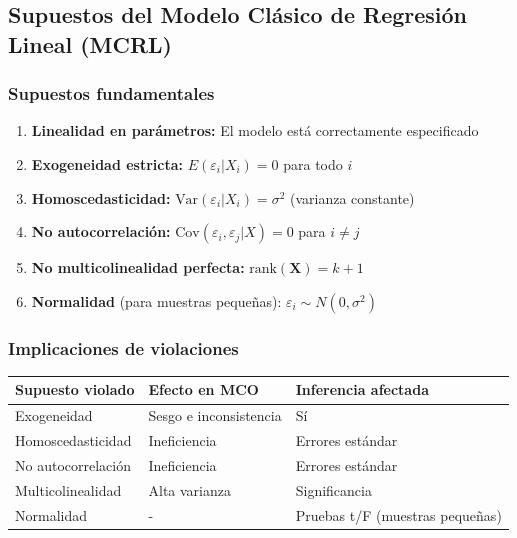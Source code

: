 \documentclass[
  oneside]{book}
\newcounter{none} %
\providecommand{\tightlist}{%
  \setlength{\itemsep}{0pt}\setlength{\parskip}{0pt}}
\begin{document}
\subsection{Supuestos del Modelo Clásico de Regresión Lineal (MCRL)}\label{supuestos-del-modelo-cluxe1sico-de-regresiuxf3n-lineal-mcrl}

\subsubsection{Supuestos fundamentales}\label{supuestos-fundamentales}

\begin{enumerate}
\def\labelenumi{\arabic{enumi}.}
\tightlist
\item
  \textbf{Linealidad en parámetros:} El modelo está correctamente especificado
\item
  \textbf{Exogeneidad estricta:} \(E(\varepsilon_i|X_i) = 0\) para todo \(i\)
\item
  \textbf{Homoscedasticidad:} \(\text{Var}(\varepsilon_i|X_i) = \sigma^2\) (varianza constante)
\item
  \textbf{No autocorrelación:} \(\text{Cov}(\varepsilon_i, \varepsilon_j|X) = 0\) para \(i \neq j\)
\item
  \textbf{No multicolinealidad perfecta:} \(\text{rank}(\mathbf{X}) = k+1\)
\item
  \textbf{Normalidad} (para muestras pequeñas): \(\varepsilon_i \sim N(0, \sigma^2)\)
\end{enumerate}

\subsubsection{Implicaciones de violaciones}\label{implicaciones-de-violaciones}

{\def\LTcaptype{none} %
\begin{longtable}[]{@{}lll@{}}
\toprule\noalign{}
Supuesto violado & Efecto en MCO & Inferencia afectada \\
\midrule\noalign{}
\endhead
\bottomrule\noalign{}
\endlastfoot
Exogeneidad & Sesgo e inconsistencia & Sí \\
Homoscedasticidad & Ineficiencia & Errores estándar \\
No autocorrelación & Ineficiencia & Errores estándar \\
Multicolinealidad & Alta varianza & Significancia \\
Normalidad & - & Pruebas t/F (muestras pequeñas) \\
\end{longtable}
}
\end{document}
